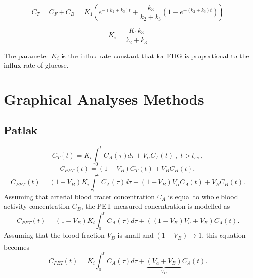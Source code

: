 \begin{equation}
C_T =  C_F + C_B = K_1 ( e^{-(k_2+k_3)t} + \frac{k_3}{k_2+k_3}(1-e^{-(k_2+k_3)t}))   
\label{eqn:2TCM}
\end{equation}

\begin{equation}
K_i = \frac{K_1 k_3}{k_2+k_3}
\label{eqn:FDG_Ki}
\end{equation}

The parameter $K_i$ is the influx rate constant that for FDG is proportional to the influx rate of glucose. 

\section{Graphical Analyses Methods}

\subsection{Patlak}
\begin{equation}
{C_{T}}(t) = {K_i} \int_{0}^{t} C_{A}(\tau) d\tau +  {V_{\alpha}} C_{A}(t) \ , \;  t>t_{ss} \ ,
\end{equation}
%
\begin{equation} 
{C_{PET}}(t)  = (1-V_{B}){C_{T}}(t) + V_{B}C_{B}(t),
\end{equation}
%
%
\begin{equation} 
{C_{PET}}(t)  = (1-V_{B}){K_i} \int_{0}^{t} C_{A}(\tau) d\tau +  (1-V_{B}) {V_{\alpha}} C_{A}(t) + V_{B}C_{B}(t).
\end{equation}
Assuming that arterial blood tracer concentration $C_{A}$ is equal to whole blood activity concentration $C_{B}$, the PET measured concentration is modelled as
\begin{equation} 
{C_{PET}}(t)  = (1-V_{B}){K_i} \int_{0}^{t} C_{A}(\tau) d\tau +  ((1-V_{B}) {V_{\alpha}}+ V_{B})C_{A}(t).
\end{equation}
Assuming that the blood fraction $V_B$ is small and $(1-V_B) \xrightarrow[]{}1$, this equation becomes
%
%
\begin{equation} 
{C_{PET}}(t)  = {K_i} \int_{0}^{t} C_{A}(\tau) d\tau +  \underbrace{({V_{\alpha}}+ V_{B})}_{V_D} C_{A}(t).
\end{equation}
%
%
%

